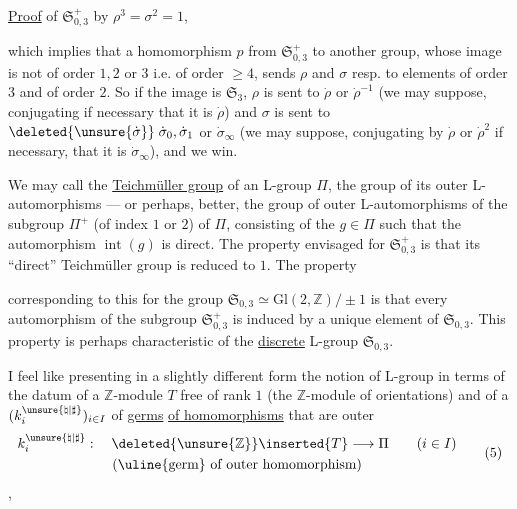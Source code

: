 \uline{Proof} 
of $\mathfrak{S}_{0,3}^{+}$ by $\rho^3=\sigma^2=1$,

which implies that a homomorphism $p$ from $\mathfrak S_{0,3}^{+}$ to another group, whose image is not of order $1,2$ or $3$ i.e. of order $\geq 4$, sends $\rho$ and $\sigma$ resp. to elements of order $3$ and of order $2$. So if the image is $\mathfrak S_3$, $\rho$ is sent to $\dot\rho$ or $\dot\rho^{-1}$ (we may suppose, conjugating if necessary  that it is $\dot\rho$) and $\sigma$ is sent to $\deleted{\unsure{\dot\sigma}}\;\dot\sigma_0,\dot\sigma_1$ or $\dot\sigma_\infty$ (we may suppose, conjugating by $\dot\rho$ or $\dot\rho^2$ if necessary, that it is $\dot\sigma_\infty$), and we win.

We may call the \uline{Teichmüller group} of an L-group $\Pi$, the group of its outer L-automorphisms --- or perhaps, better, the group of outer L-automorphisms of the subgroup $\Pi^+$ (of index $1$ or $2$) of $\Pi$, consisting of the $g\in\Pi$ such that the automorphism $\operatorname{int}(g)$ is direct. The property envisaged for $\mathfrak S_{0,3}^{+}$ is that its ``direct'' Teichmüller group is reduced to $1$. The property


corresponding to this for the group $\mathfrak S_{0,3}\simeq\mathrm{Gl}(2,\mathbb Z)/\pm1$ is that every  automorphism of the subgroup $\mathfrak S_{0,3}^{+}$ is induced by a unique element of $\mathfrak S_{0,3}$. This property is perhaps characteristic of the \uline{discrete} L-group $\mathfrak S_{0,3}$.


I feel like presenting in a slightly different form the notion of L-group\inserted{ $\Pi$,} in terms of the datum of a $\mathbb Z$-module $T$ free of rank $1$ (the $\mathbb Z$-module of orientations) and of a   $(k_i^{\unsure{\natural|\sharp}})_{i\in I}$ of \uline{germs} \uline{of homomorphisms} that are outer
\[
\begin{gathered}
k_i^{\unsure{\natural|\sharp}}:\quad \deleted{\unsure{\mathbb Z}}\inserted{T}\longrightarrow\Pi
\qquad (i\in I)\\
(\text{\uline{germ} of outer homomorphism})
\end{gathered}
\tag{5}
\]
,

